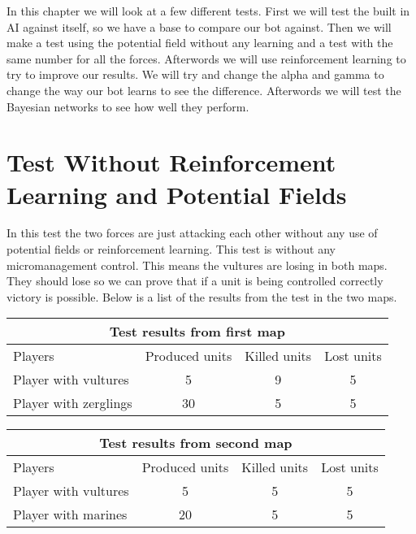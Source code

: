 
In this chapter we will look at a few different tests.
First we will test the built in AI against itself, so we have a base to compare our bot against. Then we will make a test using the potential field without any learning and a test with the same number for all the forces. Afterwords we will use reinforcement learning to try to improve our results. We will try and change the alpha and gamma to change the way our bot learns to see the difference. Afterwords we will test the Bayesian networks to see how well they perform.

\section{Test Without Reinforcement Learning and Potential Fields} %
In this test the two forces are just attacking each other without any use of potential fields or reinforcement learning. This test is without any micromanagement control. This means the vultures are losing in both maps. They should lose so we can prove that if a unit is being controlled correctly victory is possible. Below is a list of the results from the test in the two maps.\\

\begin{centering}
\begin{table}
 \begin{tabular}{|l|c|c|c|}
	\multicolumn{4}{c}{Test results from first map} \\
	\hline
		Players & Produced units & Killed units & Lost units\\
	\hline
	\hline
		Player with vultures & 5 & 9 & 5 \\
	\hline
		Player with zerglings & 30 & 5 & 5\\
	\hline

\end{tabular}
\end{table}
\end{centering}

\begin{centering}
\begin{table}
 \begin{tabular}{|l|c|c|c|}
	\multicolumn{4}{c}{Test results from second map} \\
	\hline
	Players & Produced units & Killed units & Lost units\\
	\hline
		Player with vultures & 5 & 5 & 5\\
	\hline
		Player with marines & 20 & 5 & 5\\
	\hline

\end{tabular}
\end{table}
\end{centering}

